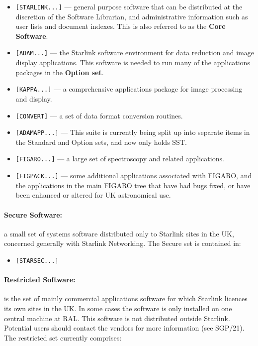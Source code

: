 \begin{itemize}

\item {\tt [STARLINK...]} --- general purpose software that can be distributed at
the discretion of the Software Librarian, and administrative information such
as user lists and document indexes. This is also referred to as the {\bf Core
Software}.

\item {\tt [ADAM...]} --- the Starlink software environment for data reduction
and image display applications. This software is needed to run many of the
applications packages in the {\bf Option set}.

\item {\tt [KAPPA...]} --- a comprehensive applications package for image
processing and display.

\item {\tt [CONVERT]} --- a set of data format conversion routines.

\item {\tt [ADAMAPP...]} --- This suite is currently being split up into
separate items in the Standard and Option sets, and now only holds SST.

\item {\tt [FIGARO...]} --- a large set of spectroscopy and related
applications. 

\item {\tt [FIGPACK...]} --- some additional applications associated with
FIGARO, and the applications in the main FIGARO tree that have had bugs fixed,
or have been enhanced or altered for UK astronomical use. 

\end{itemize}

\paragraph{Secure Software:} a small set of systems software distributed
only to Starlink sites in the UK, concerned generally with Starlink Networking.
The Secure set is contained in:

\begin{itemize}
\item {\tt [STARSEC...]}
\end{itemize}

\paragraph{Restricted Software:} is the set of mainly commercial applications
software for which Starlink licences its own sites in the UK. In some cases the
software is only installed on one central machine at RAL. This software is not
distributed outside Starlink. Potential users should contact the vendors for
more information (see SGP/21). The restricted set currently comprises:

